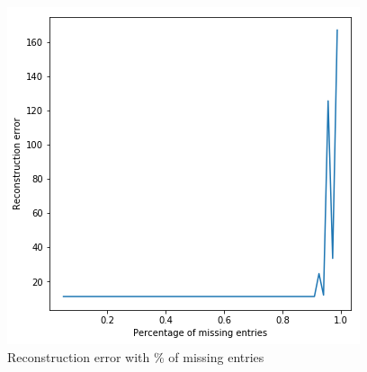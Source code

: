 \documentclass{article}
\begin{document}
\begin{figure}[h!]
\centering
\includegraphics[width=0.6\linewidth]{images/2_c.png}
\caption{Reconstruction error with \% of missing entries}
\label{fig:reconstruct_error}
\end{figure}
\end{document}
